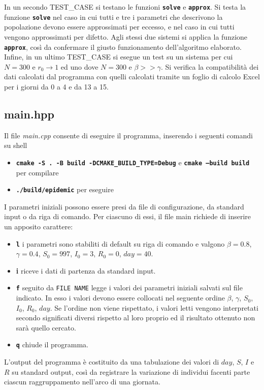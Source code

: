 \documentclass[11pt, a4paper, left=3.5cm, right=3.5cm]{article}
\begin{document}
In un secondo TEST\_CASE si testano le funzioni \textbf{\texttt{solve}} e \textbf{\texttt{approx}}. Si testa la funzione \textbf{\texttt{solve}} nel caso in cui tutti e tre i parametri che descrivono la popolazione devono essere approssimati per eccesso, e nel caso in cui tutti vengono approssimati per difetto. Agli stessi due sistemi si applica la funzione \textbf{\texttt{approx}}, cos\`{i} da confermare il giusto funzionamento dell'algoritmo elaborato. \\

Infine, in un ultimo TEST\_CASE si esegue un test su un sistema per cui $N=300$ e $r_0 \rightarrow 1$ ed uno dove  $N=300$ e $\beta >> \gamma$. Si verifica la compatibilit\`{a} dei dati calcolati dal programma con quelli calcolati tramite un foglio di calcolo Excel per i giorni da 0 a 4 e da 13 a 15. 
\subsection{main.hpp}
Il file \textit{main.cpp} consente di eseguire il programma, inserendo i seguenti comandi su shell 
\begin{itemize}
\item \texttt{\textbf{cmake -S . -B build -DCMAKE\_BUILD\_TYPE=Debug}} e \texttt{\textbf{cmake --build build}} per compilare  %
\item \texttt{\textbf{./build/epidemic}} per eseguire
\end{itemize}
I parametri iniziali possono essere presi da file di configurazione, da standard input o da riga di comando. Per ciascuno di essi, il file main richiede di inserire un apposito carattere:
\begin{itemize}
\item \textbf{\texttt{l}} i parametri sono stabiliti di default su riga di comando e valgono $\beta = 0.8$, $\gamma = 0.4$, $S_0 = 997$, $I_0 = 3$, $R_0 = 0$, $day = 40$.
\item \textbf{i} riceve i dati di partenza da standard input.
\item \textbf{\texttt{f}} seguito da \texttt{FILE NAME} legge i valori dei parametri iniziali salvati sul file indicato. In esso i valori devono essere collocati nel seguente ordine $\beta$, $\gamma$, $S_0$, $I_0$, $R_0$, $day$. Se l'ordine non viene rispettato, i valori letti vengono interpretati secondo significati diversi rispetto al loro proprio ed il risultato ottenuto non sar\`{a} quello cercato.
\item \textbf{\texttt{q}} chiude il programma.
\end{itemize}
L'output del programma è costituito da una tabulazione dei valori di $day$, $S$, $I$ e $R$ su standard output, così da registrare la variazione di individui facenti parte ciascun raggruppamento nell'arco di una giornata. \\
\end{document}
